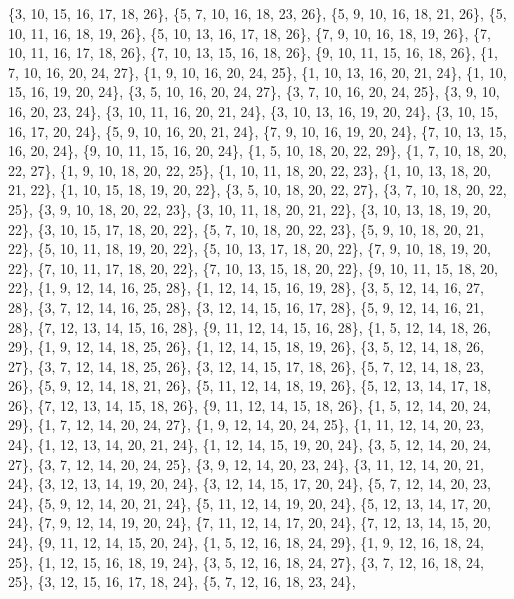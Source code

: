\documentclass[11pt,a4paper]{article}
\begin{document}
{\{3, 10, 15, 16, 17, 18, 26\}, \{5, 7, 10, 16, 18, 23, 26\}, \{5, 9, 10, 16, 18, 21, 26\}, \{5, 10, 11, 16, 18, 19, 26\}, \{5, 10, 13, 16, 17, 18, 26\},
\{7, 9, 10, 16, 18, 19, 26\}, \{7, 10, 11, 16, 17, 18, 26\}, \{7, 10, 13, 15, 16, 18, 26\}, \{9, 10, 11, 15, 16, 18, 26\}, \{1, 7, 10, 16, 20, 24, 27\},
\{1, 9, 10, 16, 20, 24, 25\}, \{1, 10, 13, 16, 20, 21, 24\}, \{1, 10, 15, 16, 19, 20, 24\}, \{3, 5, 10, 16, 20, 24, 27\}, \{3, 7, 10, 16, 20, 24, 25\},
\{3, 9, 10, 16, 20, 23, 24\}, \{3, 10, 11, 16, 20, 21, 24\}, \{3, 10, 13, 16, 19, 20, 24\}, \{3, 10, 15, 16, 17, 20, 24\}, \{5, 9, 10, 16, 20, 21, 24\},
\{7, 9, 10, 16, 19, 20, 24\}, \{7, 10, 13, 15, 16, 20, 24\}, \{9, 10, 11, 15, 16, 20, 24\}, \{1, 5, 10, 18, 20, 22, 29\}, \{1, 7, 10, 18, 20, 22, 27\},
\{1, 9, 10, 18, 20, 22, 25\}, \{1, 10, 11, 18, 20, 22, 23\}, \{1, 10, 13, 18, 20, 21, 22\}, \{1, 10, 15, 18, 19, 20, 22\}, \{3, 5, 10, 18, 20, 22, 27\},
\{3, 7, 10, 18, 20, 22, 25\}, \{3, 9, 10, 18, 20, 22, 23\}, \{3, 10, 11, 18, 20, 21, 22\}, \{3, 10, 13, 18, 19, 20, 22\}, \{3, 10, 15, 17, 18, 20, 22\},
\{5, 7, 10, 18, 20, 22, 23\}, \{5, 9, 10, 18, 20, 21, 22\}, \{5, 10, 11, 18, 19, 20, 22\}, \{5, 10, 13, 17, 18, 20, 22\}, \{7, 9, 10, 18, 19, 20, 22\},
\{7, 10, 11, 17, 18, 20, 22\}, \{7, 10, 13, 15, 18, 20, 22\}, \{9, 10, 11, 15, 18, 20, 22\}, \{1, 9, 12, 14, 16, 25, 28\}, \{1, 12, 14, 15, 16, 19, 28\},
\{3, 5, 12, 14, 16, 27, 28\}, \{3, 7, 12, 14, 16, 25, 28\}, \{3, 12, 14, 15, 16, 17, 28\}, \{5, 9, 12, 14, 16, 21, 28\}, \{7, 12, 13, 14, 15, 16, 28\},
\{9, 11, 12, 14, 15, 16, 28\}, \{1, 5, 12, 14, 18, 26, 29\}, \{1, 9, 12, 14, 18, 25, 26\}, \{1, 12, 14, 15, 18, 19, 26\}, \{3, 5, 12, 14, 18, 26, 27\},
\{3, 7, 12, 14, 18, 25, 26\}, \{3, 12, 14, 15, 17, 18, 26\}, \{5, 7, 12, 14, 18, 23, 26\}, \{5, 9, 12, 14, 18, 21, 26\}, \{5, 11, 12, 14, 18, 19, 26\},
\{5, 12, 13, 14, 17, 18, 26\}, \{7, 12, 13, 14, 15, 18, 26\}, \{9, 11, 12, 14, 15, 18, 26\}, \{1, 5, 12, 14, 20, 24, 29\}, \{1, 7, 12, 14, 20, 24, 27\},
\{1, 9, 12, 14, 20, 24, 25\}, \{1, 11, 12, 14, 20, 23, 24\}, \{1, 12, 13, 14, 20, 21, 24\}, \{1, 12, 14, 15, 19, 20, 24\}, \{3, 5, 12, 14, 20, 24, 27\},
\{3, 7, 12, 14, 20, 24, 25\}, \{3, 9, 12, 14, 20, 23, 24\}, \{3, 11, 12, 14, 20, 21, 24\}, \{3, 12, 13, 14, 19, 20, 24\}, \{3, 12, 14, 15, 17, 20, 24\},
\{5, 7, 12, 14, 20, 23, 24\}, \{5, 9, 12, 14, 20, 21, 24\}, \{5, 11, 12, 14, 19, 20, 24\}, \{5, 12, 13, 14, 17, 20, 24\}, \{7, 9, 12, 14, 19, 20, 24\},
\{7, 11, 12, 14, 17, 20, 24\}, \{7, 12, 13, 14, 15, 20, 24\}, \{9, 11, 12, 14, 15, 20, 24\}, \{1, 5, 12, 16, 18, 24, 29\}, \{1, 9, 12, 16, 18, 24, 25\},
\{1, 12, 15, 16, 18, 19, 24\}, \{3, 5, 12, 16, 18, 24, 27\}, \{3, 7, 12, 16, 18, 24, 25\}, \{3, 12, 15, 16, 17, 18, 24\}, \{5, 7, 12, 16, 18, 23, 24\},
}
\end{document}
